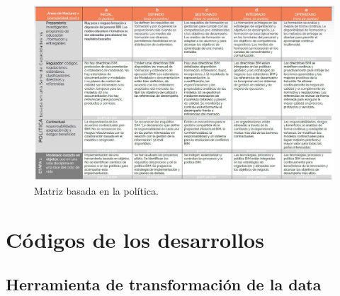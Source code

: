 \begin{figure}[H]
    \centering
    \includegraphics[width=1\linewidth]{images/matriz-madurez-3.jpeg}
    \caption{Matriz basada en la política.}
\end{figure}

\section{Códigos de los desarrollos}

\subsection{Herramienta de transformación de la data}

